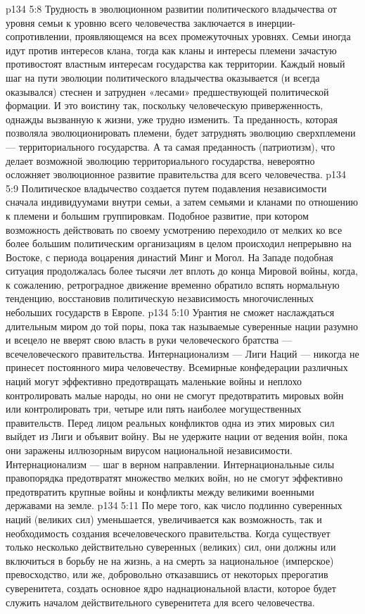 \vs p134 5:8 Трудность в эволюционном развитии политического владычества от уровня семьи к уровню всего человечества заключается в инерции\hyp{}сопротивлении, проявляющемся на всех промежуточных уровнях. Семьи иногда идут против интересов клана, тогда как кланы и интересы племени зачастую противостоят властным интересам государства как территории. Каждый новый шаг на пути эволюции политического владычества оказывается (и всегда оказывался) стеснен и затруднен «лесами» предшествующей политической формации. И это воистину так, поскольку человеческую приверженность, однажды вызванную к жизни, уже трудно изменить. Та преданность, которая позволяла эволюционировать племени, будет затруднять эволюцию сверхплемени --- территориального государства. А та самая преданность (патриотизм), что делает возможной эволюцию территориального государства, невероятно осложняет эволюционное развитие правительства для всего человечества.
\vs p134 5:9 Политическое владычество создается путем подавления независимости сначала индивидуумами внутри семьи, а затем семьями и кланами по отношению к племени и большим группировкам. Подобное развитие, при котором возможность действовать по своему усмотрению переходило от мелких ко все более большим политическим организациям в целом происходил непрерывно на Востоке, с периода воцарения династий Минг и Могол. На Западе подобная ситуация продолжалась более тысячи лет вплоть до конца Мировой войны, когда, к сожалению, ретроградное движение временно обратило вспять нормальную тенденцию, восстановив политическую независимость многочисленных небольших государств в Европе.
\vs p134 5:10 Урантия не сможет наслаждаться длительным миром до той поры, пока так называемые суверенные нации разумно и всецело не вверят свою власть в руки человеческого братства --- всечеловеческого правительства. Интернационализм --- Лиги Наций --- никогда не принесет постоянного мира человечеству. Всемирные конфедерации различных наций могут эффективно предотвращать маленькие войны и неплохо контролировать малые народы, но они не смогут предотвратить мировых войн или контролировать три, четыре или пять наиболее могущественных правительств. Перед лицом реальных конфликтов одна из этих мировых сил выйдет из Лиги и объявит войну. Вы не удержите нации от ведения войн, пока они заражены иллюзорным вирусом национальной независимости. Интернационализм --- шаг в верном направлении. Интернациональные силы правопорядка предотвратят множество мелких войн, но не смогут эффективно предотвратить крупные войны и конфликты между великими военными державами на земле.
\vs p134 5:11 По мере того, как число подлинно суверенных наций (великих сил) уменьшается, увеличивается как возможность, так и необходимость создания всечеловеческого правительства. Когда существует только несколько действительно суверенных (великих) сил, они должны или включиться в борьбу не на жизнь, а на смерть за национальное (имперское) превосходство, или же, добровольно отказавшись от некоторых прерогатив суверенитета, создать основное ядро наднациональной власти, которое будет служить началом действительного суверенитета для всего человечества.
